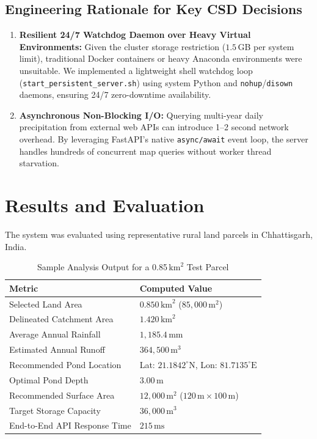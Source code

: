 \documentclass[manuscript,screen,review]{acmart}
\begin{document}
\subsection{Engineering Rationale for Key CSD Decisions}
\begin{enumerate}
    \item \textbf{Resilient 24/7 Watchdog Daemon over Heavy Virtual Environments:} Given the cluster storage restriction ($1.5$\,GB per system limit), traditional Docker containers or heavy Anaconda environments were unsuitable. We implemented a lightweight shell watchdog loop (\texttt{start\_persistent\_server.sh}) using system Python and \texttt{nohup}/\texttt{disown} daemons, ensuring 24/7 zero-downtime availability.
    \item \textbf{Asynchronous Non-Blocking I/O:} Querying multi-year daily precipitation from external web APIs can introduce 1--2 second network overhead. By leveraging FastAPI's native \texttt{async/await} event loop, the server handles hundreds of concurrent map queries without worker thread starvation.
\end{enumerate}

\section{Results and Evaluation}
\label{sec:results}
The system was evaluated using representative rural land parcels in Chhattisgarh, India.

\begin{table}[h]
  \caption{Sample Analysis Output for a 0.85\,$\text{km}^2$ Test Parcel}
  \label{tab:eval_results}
  \begin{tabular}{ll}
    \toprule
    Metric & Computed Value \\
    \midrule
    Selected Land Area & $0.850 \, \text{km}^2$ ($85,000 \, \text{m}^2$) \\
    Delineated Catchment Area & $1.420 \, \text{km}^2$ \\
    Average Annual Rainfall & $1,185.4 \, \text{mm}$ \\
    Estimated Annual Runoff & $364,500 \, \text{m}^3$ \\
    Recommended Pond Location & Lat: $21.1842^{\circ}\text{N}$, Lon: $81.7135^{\circ}\text{E}$ \\
    Optimal Pond Depth & $3.00 \, \text{m}$ \\
    Recommended Surface Area & $12,000 \, \text{m}^2$ ($120\,\text{m} \times 100\,\text{m}$) \\
    Target Storage Capacity & $36,000 \, \text{m}^3$ \\
    End-to-End API Response Time & $215 \, \text{ms}$ \\
    \bottomrule
  \end{tabular}
\end{table}
\end{document}
